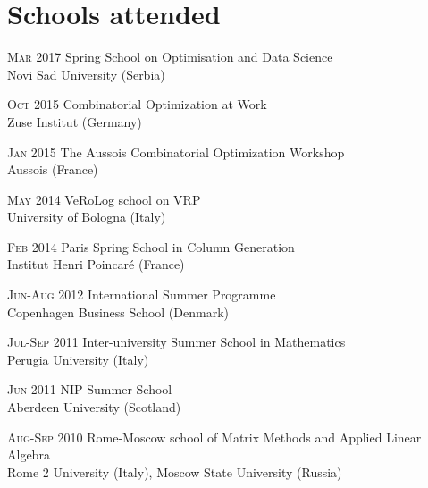 \section*{Schools attended}

\begin{paracol}{2}
  \textsc{Mar 2017}
\switchcolumn
  Spring School on Optimisation and Data Science\\
  Novi Sad University (Serbia)
\end{paracol}

\begin{paracol}{2}
  \textsc{Oct 2015}
\switchcolumn
  Combinatorial Optimization at Work\\
  Zuse Institut (Germany)
\end{paracol}

\begin{paracol}{2}
  \textsc{Jan 2015}
\switchcolumn
  The Aussois Combinatorial Optimization Workshop\\
  Aussois (France)
\end{paracol}

\begin{paracol}{2}
  \textsc{May 2014}
\switchcolumn
  VeRoLog school on VRP\\
  University of Bologna (Italy)
\end{paracol}

\begin{paracol}{2}
  \textsc{Feb 2014}
\switchcolumn
  Paris Spring School in Column Generation\\
  Institut Henri Poincaré (France)
\end{paracol}

\begin{paracol}{2}
  \textsc{Jun-Aug 2012}
\switchcolumn
  International Summer Programme\\
  Copenhagen Business School (Denmark)
\end{paracol}

\begin{paracol}{2}
  \textsc{Jul-Sep 2011}
\switchcolumn
  Inter-university Summer School in Mathematics\\
  Perugia University (Italy)
\end{paracol}

\begin{paracol}{2}
  \textsc{Jun 2011}
\switchcolumn
  NIP Summer School\\
  Aberdeen University (Scotland)
\end{paracol}

\begin{paracol}{2}
  \textsc{Aug-Sep 2010}
\switchcolumn
  Rome-Moscow school of Matrix Methods and Applied Linear Algebra\\
  Rome 2 University (Italy), Moscow State University (Russia)
\end{paracol}